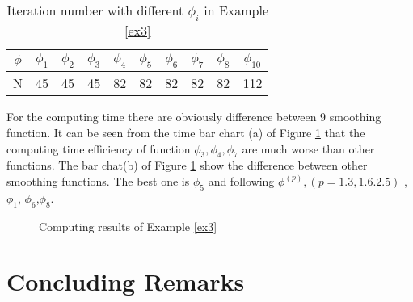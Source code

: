 \documentclass[12pt]{article}
\begin{document}
 \begin{table}[ht]
  \centering
  \begin{tabular}{c c c c c c c c c c}
     \hline
     $\phi$ & $\phi_1$ & $\phi_2$ & $\phi_3$ & $\phi_4$ & $\phi_5$ &
     $\phi_6$ & $\phi_7$ & $\phi_8$ &$\phi_{10}$ \\
      \hline
     N & 45 & 45 & 45 & 82 & 82 & 82 & 82 & 82 & 112 \\
     \hline
   \end{tabular}
  \caption{Iteration number with different $\phi_i$ in
  Example \ref{ex3}}\label{tableEx03}
\end{table}

 For the computing time there are obviously difference between 9 smoothing function.
 It can be seen from the time bar chart (a) of Figure \ref{FigEx03} that the
 computing time efficiency  of function $\phi_3,\phi_4,\phi_7$ are much worse than
 other functions. The  bar chat(b)  of  Figure  \ref{FigEx03} show the
 difference between other smoothing functions. The best  one is $\phi_5$ and
 following $\phi^{(p)},(p=1.3,1.6.2.5)$ , $\phi_1$, $\phi_6$,$\phi_8$.


\begin{figure}[ht]
\centering
{}
\caption{Computing results of Example \ref{ex3}}\label{FigEx03}
\end{figure}

 \section{Concluding Remarks}
\end{document}
